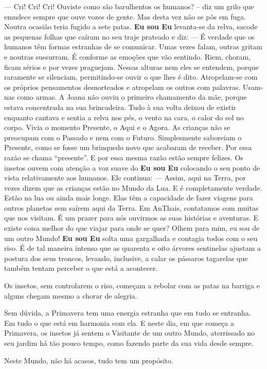 — Cri! Cri! Cri! Ouviste como são barulhentos os humanos? – diz um grilo que emudece sempre que ouve vozes de gente. Mas desta vez não se pôs em fuga. Noutra ocasião teria fugido a sete patas.
\bigbreak
\textbf{Eu sou Eu} levanta-se da relva, sacode as pequenas folhas que caíram no seu traje prateado e diz:
\bigbreak
— É verdade que os humanos têm formas estranhas de se comunicar. Umas vezes falam, outras gritam e noutras sussurram. É conforme as emoções que vão sentindo. Riem, choram, ficam sérios e por vezes praguejam. Nessas alturas nem eles se entendem, porque raramente se silenciam, permitindo-se ouvir o que lhes é dito. Atropelam-se com os próprios pensamentos desnorteados e atropelam os outros com palavras. Usam-nas como armas. A Joana não ouviu o primeiro chamamento da mãe, porque estava concentrada na sua brincadeira. Tudo à sua volta deixou de existir enquanto cantava e sentia a relva nos pés, o vento na cara, o calor do sol no corpo. Vivia o momento Presente, o Aqui e o Agora. As crianças não se preocupam com o Passado e nem com o Futuro. Simplesmente saboreiam o Presente, como se fosse um brinquedo novo que acabaram de receber. Por essa razão se chama “presente”. E por essa mesma razão estão sempre felizes.
\bigbreak
Os insetos ouvem com atenção a voz suave do \textbf{Eu sou Eu} colocando o seu ponto de vista relativamente aos humanos. Ele continua:
\bigbreak
— Assim, aqui na Terra, por vezes dizem que as crianças estão no Mundo da Lua. E é completamente verdade. Estão na lua ou ainda mais longe. Elas têm a capacidade de fazer viagens para outros planetas sem saírem aqui da Terra. Em AnThais, contatamos com muitas que nos visitam. É um prazer para nós ouvirmos as suas histórias e aventuras. E existe coisa melhor do que viajar para onde se quer? Olhem para mim, eu sou de um outro Mundo!
\bigbreak
\textbf{Eu sou Eu} solta uma gargalhada e contagia todos com o seu riso. É de tal maneira intenso que as quarenta e oito árvores sentinelas ajustam a postura dos seus troncos, levando, inclusive, a calar os pássaros tagarelas que também tentam perceber o que está a acontecer.

Os insetos, sem controlarem o riso, começam a rebolar com as patas na barriga e alguns chegam mesmo a chorar de alegria.

Sem dúvida, a Primavera tem uma energia estranha que em tudo se entranha. Em tudo o que está em harmonia com ela.
\bigbreak
E neste dia, em que começa a Primavera, os insetos já sentem o Visitante de um outro Mundo, aterrissado no seu jardim há tão pouco tempo, como fazendo parte da sua vida desde sempre.

Neste Mundo, não há acasos, tudo tem um propósito.
